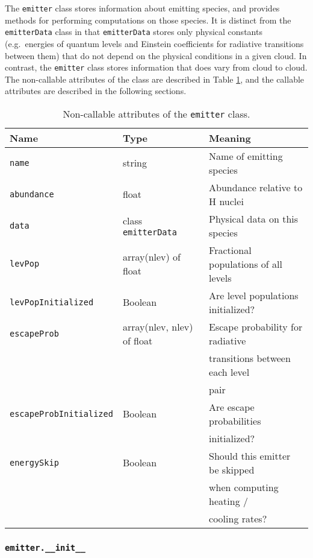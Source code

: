 \documentclass[12pt]{article}
\begin{document}
The \verb=emitter= class stores information about emitting species, and provides methods for performing computations on those species. It is distinct from the \verb=emitterData= class in that \verb=emitterData= stores only physical constants (e.g.~energies of quantum levels and Einstein coefficients for radiative transitions between them) that do not depend on the physical conditions in a given cloud. In contrast, the \verb=emitter= class stores information that does vary from cloud to cloud. The non-callable attributes of the class are described in Table \ref{tab:emitter}, and the callable attributes are described in the following sections.

\begin{table}
\begin{center}
\begin{tabular}{lll}
\hline\hline
Name & Type & Meaning \\
\hline\hline
\texttt{name} & string & Name of emitting species \\
\texttt{abundance} & float & Abundance relative to H nuclei\\
\texttt{data} & class \texttt{emitterData} & Physical data on this species \\
\texttt{levPop} & array(nlev) of float & Fractional populations of all levels \\
\texttt{levPopInitialized} & Boolean & Are level populations initialized? \\
\texttt{escapeProb} & array(nlev, nlev) of float & Escape probability for radiative \\
& & \quad transitions between each level\\
& & \quad pair \\
\texttt{escapeProbInitialized} & Boolean & Are escape probabilities \\
& & \quad initialized? \\
\texttt{energySkip} & Boolean & Should this emitter be skipped\\
& & \quad when computing heating / \\
& & \quad cooling rates? \\
\hline
\end{tabular}
\caption{
\label{tab:emitter}
Non-callable attributes of the \texttt{emitter} class.
}
\end{center}
\end{table}

\subsubsection{\texttt{emitter.\_\_init\_\_}}
\end{document}
